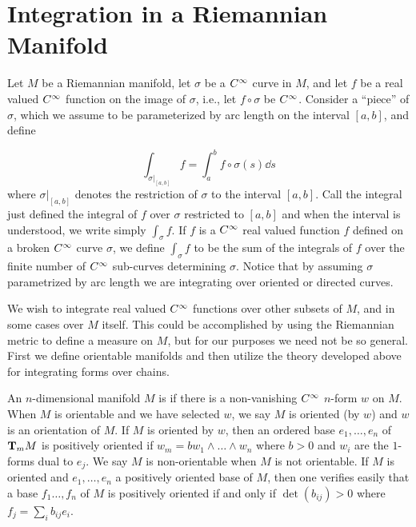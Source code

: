 \documentclass[../main]{subfiles}
\begin{document}
\section{Integration in a Riemannian Manifold}\label{ch07:s6}
Let $M$ be a Riemannian manifold, let $\sigma$ be a $\CInfty$ curve in $M$, and let $f$ be a real valued $\CInfty$ function on the image of $\sigma$, i.e., let $f \circ \sigma$ be $\CInfty$. Consider a ``piece'' of $\sigma$, which we assume to be parameterized by arc length on the interval $[a, b]$, and define

\begin{equation}\tag{19}\label{eqn:ch07.19}
\int_{\sigma \vert_[a, b]} f = \int_{a}^{b} f \circ \sigma(s) \dd s
\end{equation}
where $\sigma \vert_[a, b]$ denotes the restriction of $\sigma$ to the interval $[a, b]$. Call the integral just defined the integral of $f$ over $\sigma$ restricted to $[a, b]$ and when the interval is understood, we write simply $\int_\sigma f$. If $f$ is a $\CInfty$ real valued function $f$ defined on a broken $\CInfty$ curve $\sigma$, we define $\int_{\sigma} f$ to be the sum of the integrals of $f$ over the finite number of $\CInfty$ sub-curves determining $\sigma$. Notice that by assuming $\sigma$ parametrized by arc length we are integrating over oriented or directed curves.

We wish to integrate real valued $\CInfty$ functions over other subsets of $M$, and in some cases over $M$ itself. This could be accomplished by using the Riemannian metric to define a measure on $M$, but for our purposes we need not be so general. First we define orientable manifolds and then utilize the theory developed above for integrating forms over chains.

An $n$-dimensional manifold $M$ is  if there is a non-vanishing $\CInfty$ $n$-form $w$ on $M$. When $M$ is orientable and we have selected $w$, we say $M$ is oriented (by $w$) and $w$ is an orientation of $M$. If $M$ is oriented by $w$, then an ordered base $e_{1}, \ldots, e_{n}$ of $\tangentspace{M}{m}$ is positively oriented if $w_{m}=b w_{1} \wedge \ldots \wedge w_{n}$ where $b>0$ and $w_{i}$ are the $1$-forms dual to $e_{j} .$ We say $M$ is non-orientable when $M$ is not orientable. If $M$ is oriented and $e_{1}, \ldots, e_{n}$ a positively oriented base of $M$, then one verifies easily that a base $f_1 \ldots, f_n$ of $M$ is positively oriented if and only if $\det\left(b_{i j}\right)>0$ where $f_{j}=\sum_i b_{ij} e_i$.
\end{document}
